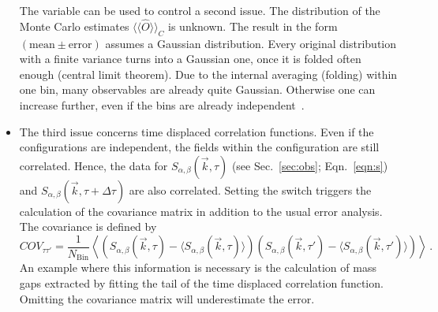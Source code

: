 \begin{itemize}
The  variable can be used to control a second issue. The distribution of the Monte Carlo estimates $\langle\langle\hat{O}\rangle\rangle_C$ is unknown. The result in the form $(\mathrm{mean}\pm \mathrm{error})$ assumes a Gaussian distribution. Every original distribution with a finite variance turns into a Gaussian one, once it is folded often enough (central limit theorem). Due to the internal averaging (folding) within one bin, many observables are already quite Gaussian. Otherwise one can increase  further, even if the bins are already independent~\cite{Bercx17}.
	\item The third issue concerns time displaced correlation functions. Even if the configurations are independent, the fields within the configuration are still correlated. Hence, the data for $S_{\alpha,\beta}(\vec{k},\tau)$ (see Sec.~\ref{sec:obs}; Eqn.~\ref{eqn:s}) and $S_{\alpha,\beta}(\vec{k},\tau+\Delta\tau)$ are also correlated. Setting the switch  triggers the calculation of the covariance matrix in addition to the usual error analysis. The covariance is defined by
	\begin{equation}
		COV_{\tau \tau'}=\frac{1}{N_{\text{Bin}}}\left\langle\left(S_{\alpha,\beta}(\vec{k},\tau)-\langle S_{\alpha,\beta}(\vec{k},\tau)\rangle\right)\left(S_{\alpha,\beta}(\vec{k},\tau')-\langle S_{\alpha,\beta}(\vec{k},\tau')\rangle\right)\right\rangle\,.
	\end{equation}
An example where this information is necessary is the  calculation of mass gaps extracted by fitting the  tail  of the time displaced correlation function.  Omitting  the covariance matrix will  underestimate the  error.
\end{itemize}


%
